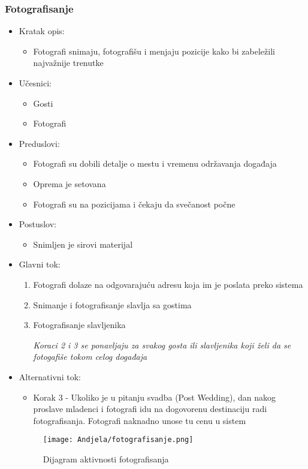 \documentclass[a4paper]{article}
\begin{document}
\subsubsection{Fotografisanje}
\begin{itemize}
    \item Kratak opis: 
    \begin{itemize}
        \item Fotografi snimaju, fotografišu i menjaju pozicije kako bi zabeležili najvažnije trenutke
    \end{itemize}
    \item Učesnici:
        \begin{itemize}
        \item Gosti
        \item Fotografi
    \end{itemize}
    \item Preduslovi:
        \begin{itemize}
            \item Fotografi su dobili detalje o mestu i vremenu održavanja događaja
            \item Oprema je setovana
            \item Fotografi su na pozicijama i čekaju da svečanost počne
        \end{itemize}
    \item Postuslov:
        \begin{itemize}
            \item Snimljen je sirovi materijal
            \end{itemize}
    \item Glavni tok:
        \begin{enumerate}
            \item Fotografi dolaze na odgovarajuću adresu koja im je poslata preko sistema
            \item Snimanje i fotografisanje slavlja sa gostima
            \item Fotografisanje slavljenika
            
            \textit{Koraci 2 i 3 se ponavljaju za svakog gosta ili slavljenika koji želi da se fotogafiše tokom celog događaja}
        \end{enumerate}
    \item Alternativni tok:
        \begin{itemize}
            \item Korak 3 - Ukoliko je u pitanju svadba (Post Wedding), dan nakog proslave mladenci i fotografi idu na dogovorenu destinaciju radi fotografisanja. Fotografi naknadno unose tu cenu u sistem
    \end{itemize}
    
    \begin{figure}[H]
    \centering
\texttt{[image: Andjela/fotografisanje.png]}
    \caption{Dijagram aktivnosti fotografisanja}
    \label{fig:RegistracijaZ}
\end{figure}
    
        
\end{itemize}
\end{document}
